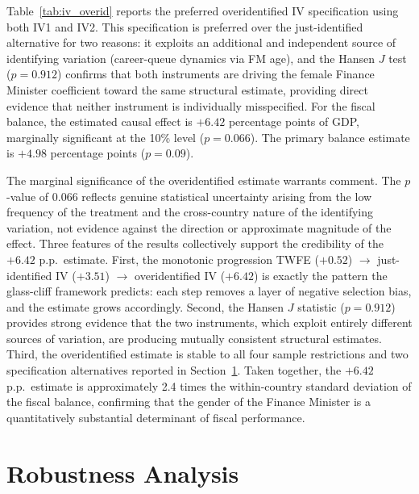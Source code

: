 \documentclass[12pt]{article}
\begin{document}
Table~\ref{tab:iv_overid} reports the preferred overidentified IV 
specification using both IV1 and IV2. This specification is preferred over the 
just-identified alternative for two reasons: it exploits an additional and 
independent source of identifying variation (career-queue dynamics via FM age), 
and the Hansen $J$ test ($p = 0.912$) confirms that both instruments 
are driving the female Finance Minister coefficient toward the same structural 
estimate, providing direct evidence that neither instrument is individually 
misspecified. For the fiscal balance, the estimated causal effect is $+6.42$ 
percentage points of GDP, marginally significant at the 10\% level 
($p = 0.066$). The primary balance estimate is $+4.98$ percentage points 
($p = 0.09$).

The marginal significance of the overidentified estimate warrants comment. 
The $p$-value of 0.066 reflects genuine statistical uncertainty arising from 
the low frequency of the treatment and the cross-country nature of the 
identifying variation, not evidence against the direction or approximate 
magnitude of the effect. Three features of the results collectively support 
the credibility of the $+6.42$ p.p.\ estimate. First, the monotonic 
progression TWFE ($+0.52$) $\to$ just-identified IV ($+3.51$) $\to$ 
overidentified IV ($+6.42$) is exactly the pattern the glass-cliff 
framework predicts: each step removes a layer of negative selection bias, and 
the estimate grows accordingly. Second, the Hansen $J$ statistic 
($p = 0.912$) provides strong evidence that the two instruments, which exploit 
entirely different sources of variation, are producing mutually consistent 
structural estimates. Third, the overidentified estimate is stable to all 
four sample restrictions and two specification alternatives reported in 
Section~\ref{sec:robustness}. Taken together, the $+6.42$ p.p.\ estimate 
is approximately 2.4 times the within-country standard deviation of the 
fiscal balance, confirming that the gender of the Finance Minister is a 
quantitatively substantial determinant of fiscal performance.



\section{Robustness Analysis}
\label{sec:robustness}
\end{document}
